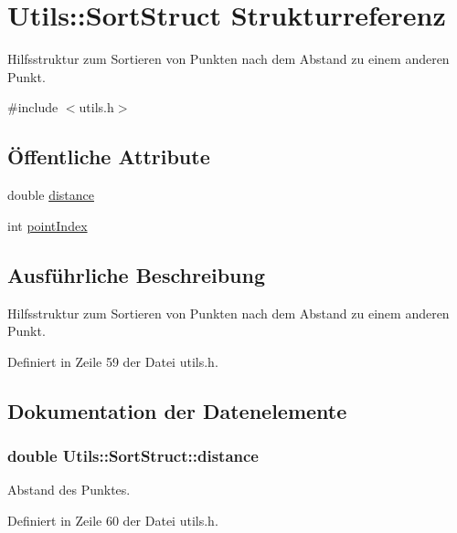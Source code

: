 \hypertarget{structUtils_1_1SortStruct}{\section{Utils\-:\-:Sort\-Struct Strukturreferenz}
\label{structUtils_1_1SortStruct}
}


Hilfsstruktur zum Sortieren von Punkten nach dem Abstand zu einem anderen Punkt.  




{\ttfamily \#include $<$utils.\-h$>$}

\subsection*{Öffentliche Attribute}
\begin{DoxyCompactItemize}
\item 
double \hyperlink{structUtils_1_1SortStruct_aca911abd52b034a588bab7b414cf93cb}{distance}
\item 
int \hyperlink{structUtils_1_1SortStruct_ad470a3f9a230e66a47fd022bf7a4a70e}{point\-Index}
\end{DoxyCompactItemize}


\subsection{Ausführliche Beschreibung}
Hilfsstruktur zum Sortieren von Punkten nach dem Abstand zu einem anderen Punkt. 

Definiert in Zeile 59 der Datei utils.\-h.



\subsection{Dokumentation der Datenelemente}
\hypertarget{structUtils_1_1SortStruct_aca911abd52b034a588bab7b414cf93cb}{
\subsubsection[{distance}]{\setlength{\rightskip}{0pt plus 5cm}double Utils\-::\-Sort\-Struct\-::distance}}\label{structUtils_1_1SortStruct_aca911abd52b034a588bab7b414cf93cb}
Abstand des Punktes. 

Definiert in Zeile 60 der Datei utils.\-h.

